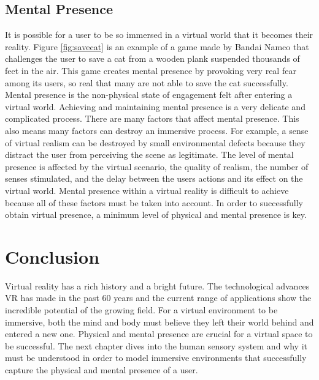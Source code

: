 	
\subsection{Mental Presence}\label{mental presence}
	
	
It is possible for a user to be so immersed in a virtual world that it becomes their reality. Figure \ref{fig:savecat} is an example of a game made by Bandai Namco that challenges the user to save a cat from a wooden plank suspended thousands of feet in the air. This game creates mental presence by provoking very real fear among its users, so real that many are not able to save the cat successfully. Mental presence is the non-physical state of engagement felt after entering a virtual world. Achieving and maintaining mental presence is a very delicate and complicated process. There are many factors that affect mental presence. This also means many factors can destroy an immersive process. For example, a sense of virtual realism can be destroyed by small environmental defects because they distract the user from perceiving the scene as legitimate. The level of mental  presence is affected by the virtual scenario, the quality of realism, the number of senses stimulated, and the delay between the users actions and its effect on the virtual world. Mental presence within a virtual reality is difficult to achieve because all of these factors must be taken into account. In order to  successfully obtain virtual presence, a minimum level of physical and mental presence is key.  

\section{Conclusion}\label{intro_conclusion}

Virtual reality has a rich history and a bright future. The technological advances VR has made in the past 60 years and the current range of applications show the incredible potential of the growing field. For a virtual environment to be immersive, both the mind and body must believe they left their world behind and entered a new one. Physical and mental presence are crucial for a virtual space to be successful. The next chapter dives into the human sensory system and why it must be understood in order to model immersive environments that successfully capture the physical and mental presence of a user. 

